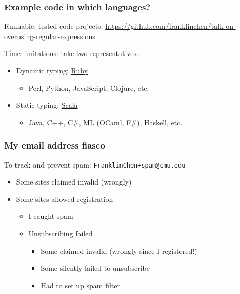 \begin{frame}
  \frametitle{Example code in which languages?}

  Runnable, tested code projects: \url{https://github.com/franklinchen/talk-on-overusing-regular-expressions}

  Time limitations: take two representatives.

  \begin{itemize}
    \item<1-> Dynamic typing: \href{http://www.ruby-lang.org/}{Ruby}
      \begin{itemize}
        \item<2-> Perl, Python, JavaScript, Clojure, etc.
      \end{itemize}
    \item<3-> Static typing: \href{http://www.scala-lang.org/}{Scala}
      \begin{itemize}
        \item<4-> Java, C++, C\#, ML (OCaml, F\#), Haskell, etc.
      \end{itemize}
  \end{itemize}

\end{frame}

\begin{frame}
  \frametitle{My email address fiasco}

  To track and prevent spam: \texttt{FranklinChen+spam@cmu.edu}

  \begin{itemize}
    \item<1-> Some sites claimed invalid (wrongly)
    \item<2-> Some sites allowed registration
      \begin{itemize}
        \item<3-> I caught spam
        \item<4-> Unsubscribing failed
          \begin{itemize}
            \item<5-> Some claimed invalid (wrongly since I registered!)
            \item<6-> Some silently failed to unsubscribe
            \item<7-> Had to set up spam filter
          \end{itemize}
      \end{itemize}
  \end{itemize}

\end{frame}

